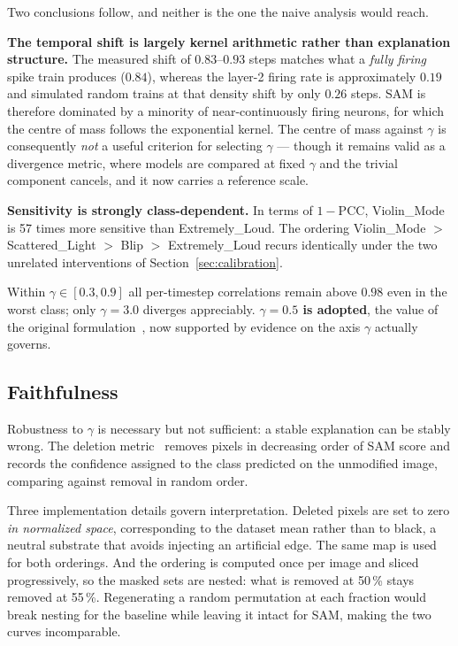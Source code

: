 Two conclusions follow, and neither is the one the naive analysis would reach.

\textbf{The temporal shift is largely kernel arithmetic rather than explanation
structure.} The measured shift of $0.83$--$0.93$ steps matches what a
\emph{fully firing} spike train produces ($0.84$), whereas the layer-2 firing
rate is approximately $0.19$ and simulated random trains at that density shift by
only $0.26$ steps. SAM is therefore dominated by a minority of near-continuously
firing neurons, for which the centre of mass follows the exponential kernel. The
centre of mass against $\gamma$ is consequently \emph{not} a useful criterion for
selecting $\gamma$ --- though it remains valid as a divergence metric, where
models are compared at fixed $\gamma$ and the trivial component cancels, and it
now carries a reference scale.

\textbf{Sensitivity is strongly class-dependent.} In terms of $1 - \mathrm{PCC}$,
Violin\_Mode is 57 times more sensitive than Extremely\_Loud. The ordering
Violin\_Mode $>$ Scattered\_Light $>$ Blip $>$ Extremely\_Loud recurs identically
under the two unrelated interventions of Section~\ref{sec:calibration}.

Within $\gamma \in [0.3, 0.9]$ all per-timestep correlations remain above $0.98$
even in the worst class; only $\gamma = 3.0$ diverges appreciably.
\textbf{$\gamma = 0.5$ is adopted}, the value of the original
formulation~\cite{kim2021sam}, now supported by evidence on the axis $\gamma$
actually governs.

\subsection{Faithfulness}

Robustness to $\gamma$ is necessary but not sufficient: a stable explanation can
be stably wrong. The deletion metric~\cite{petsiuk2018rise} removes pixels in
decreasing order of SAM score and records the confidence assigned to the class
predicted on the unmodified image, comparing against removal in random order.

Three implementation details govern interpretation. Deleted pixels are set to
zero \emph{in normalized space}, corresponding to the dataset mean rather than to
black, a neutral substrate that avoids injecting an artificial edge. The same map
is used for both orderings. And the ordering is computed once per image and
sliced progressively, so the masked sets are nested: what is removed at 50\,\%
stays removed at 55\,\%. Regenerating a random permutation at each fraction would
break nesting for the baseline while leaving it intact for SAM, making the two
curves incomparable.

